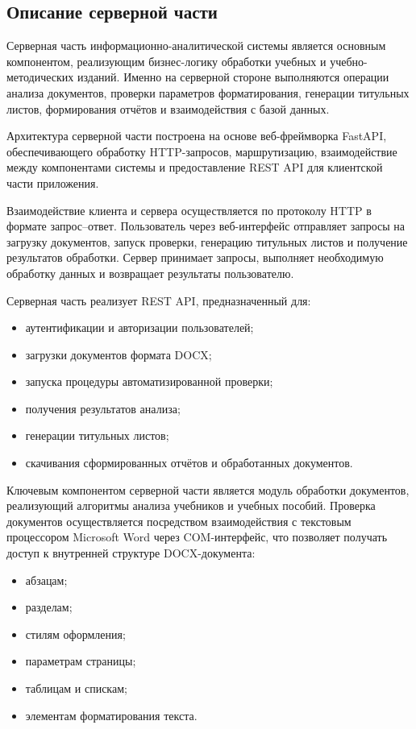 \subsection{Описание серверной части}

Серверная часть информационно-аналитической системы является основным компонентом, реализующим бизнес-логику обработки учебных и учебно-методических изданий. Именно на серверной стороне выполняются операции анализа документов, проверки параметров форматирования, генерации титульных листов, формирования отчётов и взаимодействия с базой данных.

Архитектура серверной части построена на основе веб-фреймворка FastAPI, обеспечивающего обработку HTTP-запросов, маршрутизацию, взаимодействие между компонентами системы и предоставление REST API для клиентской части приложения.

Взаимодействие клиента и сервера осуществляется по протоколу HTTP в формате запрос--ответ. Пользователь через веб-интерфейс отправляет запросы на загрузку документов, запуск проверки, генерацию титульных листов и получение результатов обработки. Сервер принимает запросы, выполняет необходимую обработку данных и возвращает результаты пользователю.

Серверная часть реализует REST API, предназначенный для:
\begin{itemize}
	\item аутентификации и авторизации пользователей;
	\item загрузки документов формата DOCX;
	\item запуска процедуры автоматизированной проверки;
	\item получения результатов анализа;
	\item генерации титульных листов;
	\item скачивания сформированных отчётов и обработанных документов.
\end{itemize}

Ключевым компонентом серверной части является модуль обработки документов, реализующий алгоритмы анализа учебников и учебных пособий. Проверка документов осуществляется посредством взаимодействия с текстовым процессором Microsoft Word через COM-интерфейс, что позволяет получать доступ к внутренней структуре DOCX-документа:
\begin{itemize}
	\item абзацам;
	\item разделам;
	\item стилям оформления;
	\item параметрам страницы;
	\item таблицам и спискам;
	\item элементам форматирования текста.
\end{itemize}

